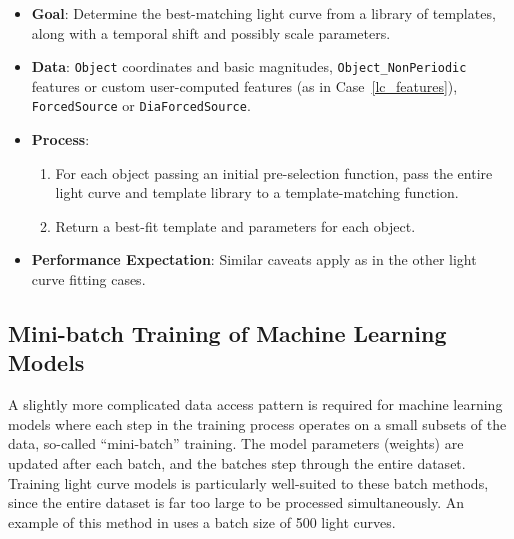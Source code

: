 \documentclass[DM,authoryear,toc]{lsstdoc}
\begin{document}
\begin{itemize}
  \item \textbf{Goal}: Determine the best-matching light curve from a library of
  templates, along with a temporal shift and possibly scale parameters. \item
  \textbf{Data}: \texttt{Object} coordinates and basic magnitudes,
  \texttt{Object\_NonPeriodic} features or custom user-computed features (as in
  Case~\ref{lc_features}),
  \texttt{ForcedSource} or \texttt{DiaForcedSource}.
  \item \textbf{Process}:
    \begin{enumerate}
      \item For each object passing an initial pre-selection function, pass the
      entire light curve and template library to a template-matching function.
      \item Return a best-fit template and parameters for each object.
    \end{enumerate}
  \item \textbf{Performance Expectation}: Similar caveats apply as in the other
  light curve fitting cases.
\end{itemize}

\subsection{Mini-batch Training of Machine Learning Models}

A slightly more complicated data access pattern is required for machine learning
models where each step in the training process operates on a small subsets of
the data, so-called ``mini-batch'' training. The model parameters (weights) are
updated after each batch, and the batches step through the entire dataset.
Training light curve models is
particularly well-suited to these batch methods, since the entire dataset is far
too large to be processed simultaneously. An example of this method in
\citet{2018NatAs...2..151N} uses a batch size of 500 light curves.
\end{document}
